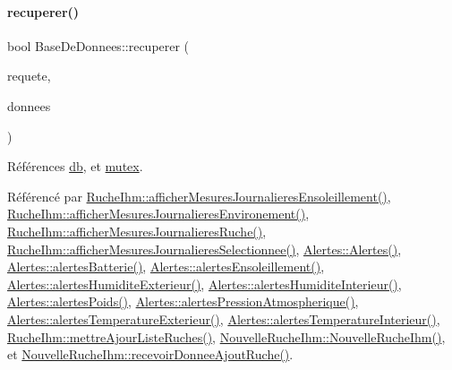\paragraph{\texorpdfstring{recuperer()}{recuperer()}\hspace{0.1cm}{\footnotesize\ttfamily [1/4]}}
{\footnotesize\ttfamily bool Base\+De\+Donnees\+::recuperer (\begin{DoxyParamCaption}\item[{Q\+String}]{requete,  }\item[{Q\+String \&}]{donnees }\end{DoxyParamCaption})}



Références \hyperlink{class_base_de_donnees_a3e738dcf443370c46a541677ab619f06}{db}, et \hyperlink{class_base_de_donnees_aa1b4696fac87a740f914aa73739086f2}{mutex}.



Référencé par \hyperlink{class_ruche_ihm_abc250d15e6782c522b3d6676e0ee032d}{Ruche\+Ihm\+::afficher\+Mesures\+Journalieres\+Ensoleillement()}, \hyperlink{class_ruche_ihm_a5ee5942435915ca134765f42ff4b9061}{Ruche\+Ihm\+::afficher\+Mesures\+Journalieres\+Environement()}, \hyperlink{class_ruche_ihm_a94bd98327a73a15aad1306fc31f53ce8}{Ruche\+Ihm\+::afficher\+Mesures\+Journalieres\+Ruche()}, \hyperlink{class_ruche_ihm_a7f66af552d9e7ba0d00437ff3b330706}{Ruche\+Ihm\+::afficher\+Mesures\+Journalieres\+Selectionnee()}, \hyperlink{class_alertes_ad2e4e3907f97bdd06840dfeee0a87ddb}{Alertes\+::\+Alertes()}, \hyperlink{class_alertes_ad708a4b800d56c1439b65d12a3c6b027}{Alertes\+::alertes\+Batterie()}, \hyperlink{class_alertes_ae7ad960c530a6a7e82df3ed55d159a68}{Alertes\+::alertes\+Ensoleillement()}, \hyperlink{class_alertes_a8606946eaa04dfd29bb7951b2b850a04}{Alertes\+::alertes\+Humidite\+Exterieur()}, \hyperlink{class_alertes_a7558cb097dc392547ceb12ab4d6cbd4c}{Alertes\+::alertes\+Humidite\+Interieur()}, \hyperlink{class_alertes_ac4b8925cc6c262cf7254b1576ba07d33}{Alertes\+::alertes\+Poids()}, \hyperlink{class_alertes_ab8a33e82cdd4d4e0560c9ba6e10ca8d5}{Alertes\+::alertes\+Pression\+Atmospherique()}, \hyperlink{class_alertes_a91fb2665fa8b6c32c74bfe4d1b89a2d8}{Alertes\+::alertes\+Temperature\+Exterieur()}, \hyperlink{class_alertes_a8bc56cf9eb525624b2c1f5b20f86724b}{Alertes\+::alertes\+Temperature\+Interieur()}, \hyperlink{class_ruche_ihm_a77cb005fde7e2271e8721c23cef13b3e}{Ruche\+Ihm\+::mettre\+Ajour\+Liste\+Ruches()}, \hyperlink{class_nouvelle_ruche_ihm_a338b9af0b96ed0839a8d5008c8c89cc4}{Nouvelle\+Ruche\+Ihm\+::\+Nouvelle\+Ruche\+Ihm()}, et \hyperlink{class_nouvelle_ruche_ihm_a268e781b033f2531ca5eab19cc828fdc}{Nouvelle\+Ruche\+Ihm\+::recevoir\+Donnee\+Ajout\+Ruche()}.


